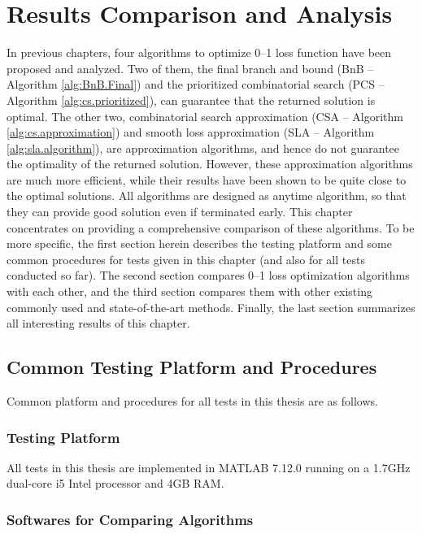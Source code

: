 \section{Results Comparison and Analysis}
\label{cha:results}

In previous chapters, four algorithms to optimize 0--1 loss function
have been proposed and analyzed. Two of them, the final branch and
bound (BnB -- Algorithm \ref{alg:BnB.Final}) and the prioritized
combinatorial search (PCS -- Algorithm \ref{alg:cs.prioritized}), can
guarantee that the returned solution is optimal. The other two,
combinatorial search approximation (CSA -- Algorithm
\ref{alg:cs.approximation}) and smooth loss approximation (SLA --
Algorithm \ref{alg:sla.algorithm}), are approximation algorithms, and
hence do not guarantee the optimality of the returned
solution. However, these approximation algorithms are much more
efficient, while their results have been shown to be quite close to
the optimal solutions. All algorithms are designed as anytime
algorithm, so that they can provide good solution even if terminated
early. This chapter concentrates on providing a comprehensive
comparison of these algorithms. To be more specific, the first section
herein describes the testing platform and some common procedures for
tests given in this chapter (and also for all tests conducted so
far). The second section compares 0--1 loss optimization algorithms
with each other, and the third section compares them with other
existing commonly used and state-of-the-art methods. Finally, the last
section summarizes all interesting results of this chapter.


\subsection{Common Testing Platform and Procedures}
\label{sec:rc.method}

Common platform and procedures for all tests in this thesis are as follows. 

\subsubsection{Testing Platform}

All tests in this thesis are implemented in MATLAB 7.12.0 running on a
1.7GHz dual-core i5 Intel processor and 4GB RAM.

\subsubsection{Softwares for Comparing Algorithms}

